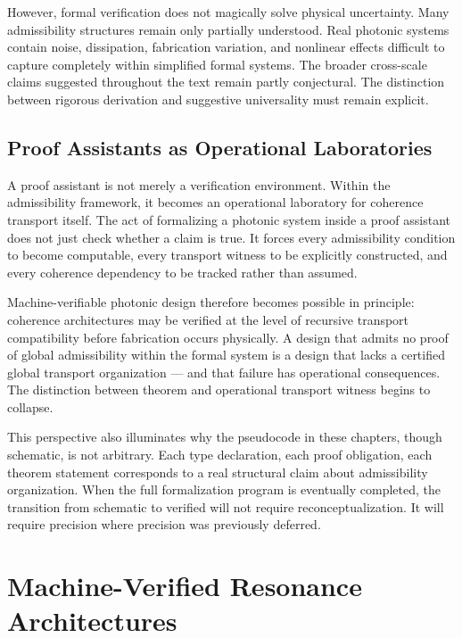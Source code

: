 \documentclass[11pt,openany]{book}
\theoremstyle{definition}
\theoremstyle{plain}
\begin{document}
However, formal verification does not magically solve physical uncertainty. Many admissibility structures remain only partially understood. Real photonic systems contain noise, dissipation, fabrication variation, and nonlinear effects difficult to capture completely within simplified formal systems. The broader cross-scale claims suggested throughout the text remain partly conjectural. The distinction between rigorous derivation and suggestive universality must remain explicit.

\section{Proof Assistants as Operational Laboratories}

A proof assistant is not merely a verification environment. Within the admissibility framework, it becomes an operational laboratory for coherence transport itself. The act of formalizing a photonic system inside a proof assistant does not just check whether a claim is true. It forces every admissibility condition to become computable, every transport witness to be explicitly constructed, and every coherence dependency to be tracked rather than assumed.

Machine-verifiable photonic design therefore becomes possible in principle: coherence architectures may be verified at the level of recursive transport compatibility before fabrication occurs physically. A design that admits no proof of global admissibility within the formal system is a design that lacks a certified global transport organization --- and that failure has operational consequences. The distinction between theorem and operational transport witness begins to collapse.

This perspective also illuminates why the pseudocode in these chapters, though schematic, is not arbitrary. Each type declaration, each proof obligation, each theorem statement corresponds to a real structural claim about admissibility organization. When the full formalization program is eventually completed, the transition from schematic to verified will not require reconceptualization. It will require precision where precision was previously deferred.


\chapter{Machine-Verified Resonance Architectures}
\end{document}
